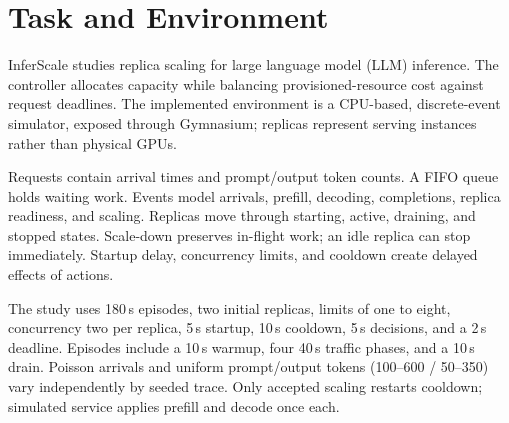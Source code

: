\documentclass[10pt,a4paper,twocolumn]{article}
\begin{document}

\section{Task and Environment}
InferScale studies replica scaling for large language model (LLM) inference.
The controller allocates capacity while balancing provisioned-resource cost
against request deadlines. The implemented environment is a CPU-based,
discrete-event simulator, exposed through Gymnasium; replicas represent serving
instances rather than physical GPUs.

Requests contain arrival times and prompt/output token counts. A FIFO queue
holds waiting work. Events model arrivals, prefill, decoding, completions,
replica readiness, and scaling. Replicas move through starting, active, draining,
and stopped states. Scale-down preserves in-flight work; an idle replica can
stop immediately. Startup delay, concurrency limits, and cooldown create delayed
effects of actions.

The study uses 180\,s episodes, two initial replicas, limits of one to eight,
concurrency two per replica, 5\,s startup, 10\,s cooldown, 5\,s decisions,
and a 2\,s deadline. Episodes include a 10\,s warmup, four 40\,s traffic
phases, and a 10\,s drain. Poisson arrivals and uniform prompt/output tokens
(100--600 / 50--350) vary independently by seeded trace. Only accepted scaling
restarts cooldown; simulated service applies prefill and decode once each.
\end{document}
